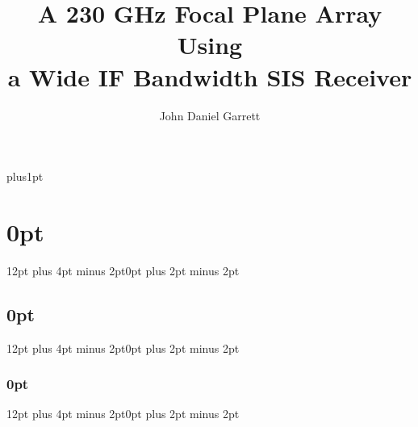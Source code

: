 \documentclass[12pt,dvipsnames,twoside,openright]{ociamthesis}
\title{A 230 GHz Focal Plane Array Using \\[1ex] a Wide IF Bandwidth SIS Receiver}
\author{John Daniel Garrett}
\begin{document}
\baselineskip=18pt plus1pt
\setcounter{secnumdepth}{3}
\setcounter{tocdepth}{1}
\titlespacing\section{0pt}{12pt plus 4pt minus 2pt}{0pt plus 2pt minus 2pt}
\titlespacing\subsection{0pt}{12pt plus 4pt minus 2pt}{0pt plus 2pt minus 2pt}
\titlespacing\subsubsection{0pt}{12pt plus 4pt minus 2pt}{0pt plus 2pt minus 2pt}
\setlength{\abovedisplayskip}{1em}
\setlength{\belowdisplayskip}{1em}

\maketitle
        
        

  
\begin{romanpages}          
\tableofcontents          
\listoffigures
\listoftables
\end{romanpages}           

\setlength{\parskip}{0.5em}
\pagestyle{fancy}
\fancyhead{}
\fancyhead[RO]{\emph{\rightmark}}
\fancyhead[LE]{\emph{\leftmark}}
\setlength{\headheight}{15pt}





\appendix


\renewcommand{\bibname}{References}


\end{document}
